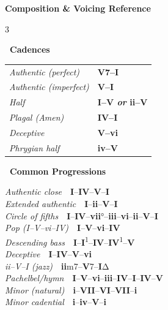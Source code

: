 \documentclass[letterpaper]{article}
\newcommand{\inv}[1]{\textsuperscript{#1}}
\newcommand{\rn}[2]{\textbf{#1}#2}
\newcommand{\sect}[2]{%
  \noindent\begin{minipage}{\linewidth}%
  \colorbox{headerbg}{\color{white}\textbf{\ #1\ }}\par
  \vspace{1mm}
  #2
  \end{minipage}\par\vspace{2.5mm}%
}
\begin{document}
\begin{center}
{\fontsize{16}{19}\selectfont\textbf{Composition \& Voicing Reference}}
\end{center}

\vspace{-1mm}

\fontsize{8}{9.8}\selectfont
\setlength{\columnsep}{3mm}
\setlength{\columnseprule}{0.3pt}
\raggedcolumns
\begin{multicols}{3}

\sect{Cadences}{%
\renewcommand{\arraystretch}{1.25}
\setlength{\tabcolsep}{3pt}
\begin{tabular}{@{}ll@{}}
\cellcolor{cadAuth!15}\textit{Authentic (perfect)} & \cellcolor{cadAuth!15}\textcolor{cadAuth}{\textbf{\rn{V}{7}--\rn{I}{}}} \\
\cellcolor{cadAuth!15}\textit{Authentic (imperfect)} & \cellcolor{cadAuth!15}\textcolor{cadAuth}{\textbf{\rn{V}{}--\rn{I}{}}} \\
\cellcolor{cadHalf!15}\textit{Half} & \cellcolor{cadHalf!15}\textcolor{cadHalf}{\textbf{\rn{I}{}--\rn{V}{} \textit{or} \rn{ii}{}--\rn{V}{}}} \\
\cellcolor{cadPlag!15}\textit{Plagal (Amen)} & \cellcolor{cadPlag!15}\textcolor{cadPlag}{\textbf{\rn{IV}{}--\rn{I}{}}} \\
\cellcolor{cadDec!15}\textit{Deceptive} & \cellcolor{cadDec!15}\textcolor{cadDec}{\textbf{\rn{V}{}--\rn{vi}{}}} \\
\cellcolor{cadPhr!15}\textit{Phrygian half} & \cellcolor{cadPhr!15}\textcolor{cadPhr}{\textbf{\rn{iv}{}--\rn{V}{}}} \\
\end{tabular}%
}

\sect{Common Progressions}{%
\textit{Authentic close}\ \ \rn{I}{}--\rn{IV}{}--\rn{V}{}--\rn{I}{}\\
\textit{Extended authentic}\ \ \rn{I}{}--\rn{ii}{}--\rn{V}{}--\rn{I}{}\\
\textit{Circle of fifths}\ \ \rn{I}{}--\rn{IV}{}--\rn{vii}{°}--\rn{iii}{}--\rn{vi}{}--\rn{ii}{}--\rn{V}{}--\rn{I}{}\\
\textit{Pop (I--V--vi--IV)}\ \ \rn{I}{}--\rn{V}{}--\rn{vi}{}--\rn{IV}{}\\
\textit{Descending bass}\ \ \rn{I}{}--\rn{I}{}\inv{1}--\rn{IV}{}--\rn{IV}{}\inv{1}--\rn{V}{}\\
\textit{Deceptive}\ \ \rn{I}{}--\rn{IV}{}--\rn{V}{}--\rn{vi}{}\\
\textit{ii--V--I (jazz)}\ \ \rn{ii}{m7}--\rn{V}{7}--\rn{I}{}Δ\\
\textit{Pachelbel/hymn}\ \ \rn{I}{}--\rn{V}{}--\rn{vi}{}--\rn{iii}{}--\rn{IV}{}--\rn{I}{}--\rn{IV}{}--\rn{V}{}\\
\textit{Minor (natural)}\ \ \rn{i}{}--\rn{VII}{}--\rn{VI}{}--\rn{VII}{}--\rn{i}{}\\
\textit{Minor cadential}\ \ \rn{i}{}--\rn{iv}{}--\rn{V}{}--\rn{i}{}%
}


\end{multicols}
\end{document}
